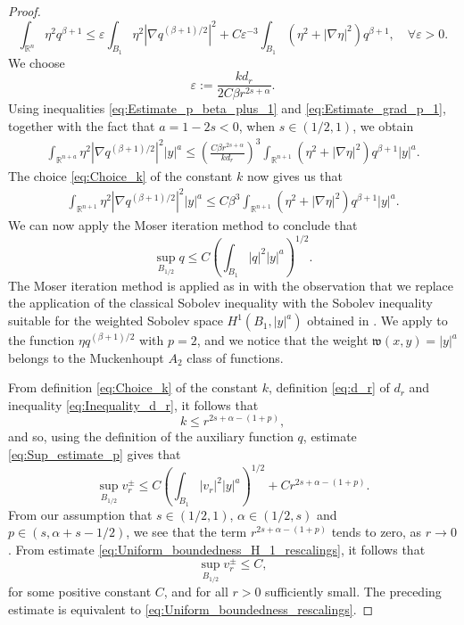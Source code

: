 \documentclass[11pt,reqno]{amsart}
\theoremstyle{definition}
\theoremstyle{remark}
\begin{document}
\begin{proof}
\begin{equation}
\label{eq:Estimate_p_beta_plus_1}
\int_{{\mathbb{R}}^n} \eta^2 q^{\beta+1} \leq {\varepsilon}\int_{B_1} \eta^2 \left|\nabla q^{(\beta+1)/2}\right|^2 + C{\varepsilon}^{-3}\int_{B_1} \left(\eta^2+|\nabla\eta|^2\right)q^{\beta+1},\quad\forall {\varepsilon}>0.
\end{equation}
We choose
$$
{\varepsilon}:=\frac{k d_r}{2C\beta r^{2s+\alpha}}.
$$
Using inequalities \eqref{eq:Estimate_p_beta_plus_1} and \eqref{eq:Estimate_grad_p_1}, together with the fact that $a=1-2s<0$, when $s\in (1/2,1)$, we obtain
\begin{align*}
\int_{{\mathbb{R}}^{n+a}} \eta^2 \left|\nabla q^{(\beta+1)/2}\right|^2  |y|^a 
\leq \left(\frac{C\beta r^{2s+\alpha}}{k d_r}\right)^3\int_{{\mathbb{R}}^{n+1}} \left(\eta^2+|\nabla\eta|^2\right) q^{\beta+1} |y|^a.
\end{align*}
The choice \eqref{eq:Choice_k} of the constant $k$ now gives us that
\begin{align*}
\int_{{\mathbb{R}}^{n+1}} \eta^2 \left|\nabla q^{(\beta+1)/2}\right|^2  |y|^a \leq C \beta^3\int_{{\mathbb{R}}^{n+1}} \left(\eta^2+|\nabla\eta|^2\right) q^{\beta+1} |y|^a.
\end{align*}
We can now apply the Moser iteration method to conclude that
\begin{equation}
\label{eq:Sup_estimate_p}
\sup_{B_{1/2}} q \leq C \left(\int_{B_1} |q|^2|y|^a\right)^{1/2}.
\end{equation}
The Moser iteration method is applied as in \cite[p. 195-197]{GilbargTrudinger} with the observation that we replace the application of the classical Sobolev inequality \cite[Inequality (7.26)]{GilbargTrudinger} with the Sobolev inequality suitable for the weighted Sobolev space $H^1(B_1,|y|^a)$ obtained in \cite[Theorem (1.6)]{Fabes_Kenig_Serapioni_1982a}. We apply \cite[Theorem (1.6)]{Fabes_Kenig_Serapioni_1982a} to the function $\eta q^{(\beta+1)/2}$ with $p=2$, and we notice that the weight ${{\mathfrak{w}}}(x,y)=|y|^a$ belongs to the Muckenhoupt $A_2$ class of functions.

From definition \eqref{eq:Choice_k} of the constant $k$, definition \eqref{eq:d_r} of $d_r$ and inequality \eqref{eq:Inequality_d_r}, it follows that
$$
k \leq r^{2s+\alpha-(1+p)},
$$
and so, using the definition of the auxiliary function $q$, estimate \eqref{eq:Sup_estimate_p} gives that
$$
\sup_{B_{1/2}} v_r^{\pm} \leq C \left(\int_{B_1} |v_r|^2|y|^a\right)^{1/2} + Cr^{2s+\alpha-(1+p)}.
$$
From our assumption that $s\in (1/2, 1)$, $\alpha\in (1/2,s)$ and $p \in (s,\alpha+s-1/2)$, we see that the term $r^{2s+\alpha-(1+p)}$ tends to zero, as $r\rightarrow 0$. From estimate \eqref{eq:Uniform_boundedness_H_1_rescalings}, it follows that
$$
\sup_{B_{1/2}} v_r^{\pm} \leq C,
$$
for some positive constant $C$, and for all $r>0$ sufficiently small. The preceding estimate is equivalent to \eqref{eq:Uniform_boundedness_rescalings}.
\end{proof}
\end{document}
